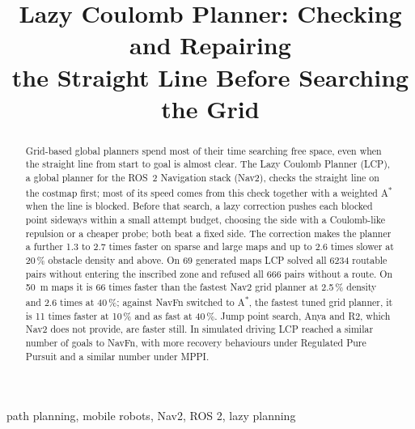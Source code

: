 \documentclass[conference]{IEEEtran}
\newcommand{\lcp}{LCP}
\begin{document}
\title{Lazy Coulomb Planner: Checking and Repairing\\the Straight Line Before Searching the Grid}

\author{
\and
{}
}

\maketitle

\begin{abstract}
Grid-based global planners spend most of their time searching free space, even
when the straight line from start to goal is almost clear. The Lazy Coulomb Planner
(\lcp), a global planner for the ROS~2 Navigation stack (Nav2), checks the straight
line on the costmap first; most of its speed comes from this check together with a
weighted A\textsuperscript{*} when the line is blocked. Before that search, a lazy
correction pushes each blocked point sideways within a small attempt budget,
choosing the side with a Coulomb-like repulsion or a cheaper probe; both beat a
fixed side. The correction makes the planner a further 1.3 to 2.7 times faster on
sparse and large maps and up to 2.6 times slower at 20\,\% obstacle density and above.
On 69 generated maps \lcp{} solved all \num{6234} routable pairs without entering
the inscribed zone and refused all 666 pairs without a route. On \SI{50}{m} maps it
is 66 times faster than the fastest Nav2 grid planner at 2.5\,\% density and 2.6
times at 40\,\%; against NavFn switched to A\textsuperscript{*}, the fastest tuned
grid planner, it is 11 times faster at 10\,\% and as fast at 40\,\%. Jump point
search, Anya and R2, which Nav2 does not provide, are faster still. In simulated
driving \lcp{} reached a similar number of goals to NavFn, with more recovery
behaviours under Regulated Pure Pursuit and a similar number under MPPI.
\end{abstract}

\begin{IEEEkeywords}
path planning, mobile robots, Nav2, ROS 2, lazy planning
\end{IEEEkeywords}
\end{document}
